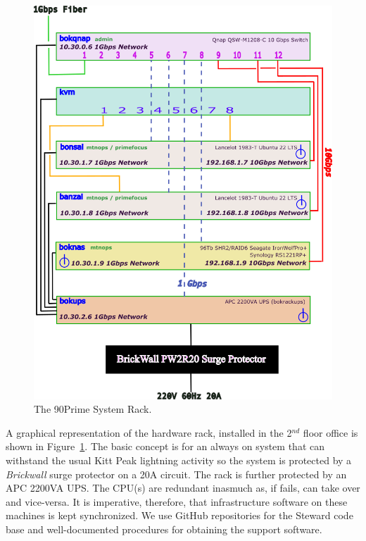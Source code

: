\documentclass[12pt,twoside]{article}
\begin{document}
\begin{figure}
 \centering
 \includegraphics[angle=0,scale=0.75]{bokrack.png}
 \caption{The 90Prime System Rack.}
 \label{bokrack}
\end{figure}

\noindent A graphical representation of the hardware rack, installed in the 2$^{nd}$ floor office is shown in Figure~\ref{bokrack}.
The basic concept is for an {\sc always on} system that can withstand the usual Kitt Peak lightning activity so the
system is protected by a \emph{Brickwall} surge protector on a 20A circuit. The rack is further protected by an APC 
2200VA UPS. The CPU(s) are redundant inasmuch as, if  fails,  can take over and vice-versa.
It is imperative, therefore, that infrastructure software on these machines is kept synchronized. We use GitHub repositories
for the Steward code base and well-documented procedures for obtaining the support software.
\end{document}
